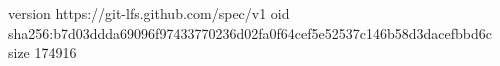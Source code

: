 version https://git-lfs.github.com/spec/v1
oid sha256:b7d03ddda69096f97433770236d02fa0f64cef5e52537c146b58d3dacefbbd6c
size 174916
